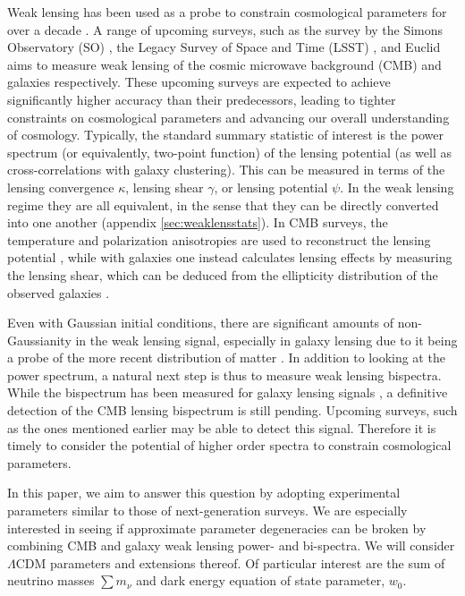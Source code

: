 \documentclass[11pt]{article} %
\begin{document}
Weak lensing has been used as a probe to constrain cosmological parameters for over a decade \cite{kilbinger2015cosmology,Bacon2000,Kaiser2000,Waerbeke2000,Bartelmann2001}. A range of upcoming surveys, such as the survey by the Simons Observatory (SO) \cite{Ade2019}, the Legacy Survey of Space and Time (LSST) \cite{Ivezic2019}, and Euclid \cite{Laureijs2011} aims to measure weak lensing of the cosmic microwave background (CMB) and galaxies respectively. These upcoming surveys are expected to achieve significantly higher accuracy than their predecessors, leading to tighter constraints on cosmological parameters and advancing our overall understanding of cosmology. Typically, the standard summary statistic of interest is the power spectrum (or equivalently, two-point function) of the lensing potential (as well as cross-correlations with galaxy clustering). This can be measured in terms of the lensing convergence $\kappa$, lensing shear $\gamma$, or lensing potential $\psi$. In the weak lensing regime they are all equivalent, in the sense that they can be directly converted into one another (appendix \ref{sec:weaklensstats}). In CMB surveys, the temperature and polarization anisotropies are used to reconstruct the lensing potential \cite{Hu_2002}, while with galaxies one instead calculates lensing effects by measuring the lensing shear, which can be deduced from the ellipticity distribution of the observed galaxies \cite{HoekstraJain2008}.

Even with Gaussian initial conditions, there are significant amounts of non-Gaussianity in the weak lensing signal, especially in galaxy lensing due to it being a probe of the more recent distribution of matter \cite{Bernardeau1997,Takada2003}. In addition to looking at the power spectrum, a natural next step is thus to measure weak lensing bispectra. While the bispectrum has been measured for galaxy lensing signals \cite{vanWaerbeke2002}, a definitive detection of the CMB lensing bispectrum is still pending. Upcoming surveys, such as the ones mentioned earlier may be able to detect this signal. Therefore it is timely to consider the potential of higher order spectra to constrain cosmological parameters. 

In this paper, we aim to answer this question by adopting experimental parameters similar to those of next-generation surveys. We are especially interested in seeing if approximate parameter degeneracies can be broken by combining CMB and galaxy weak lensing power- and bi-spectra. 
We will consider $\Lambda$CDM parameters and extensions thereof. Of particular interest are the sum of neutrino masses $\sum m_\nu$ and dark energy equation of state parameter, $w_0$. 
\end{document}
